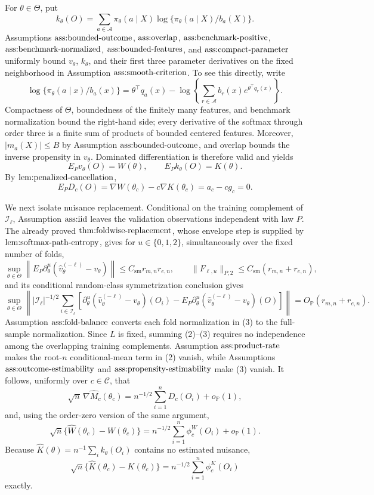 For \(\theta\in\Theta\), put
\[
 k_\theta(O)=\sum_{a\in\mathcal A}\pi_\theta(a\mid X)
 \log\{\pi_\theta(a\mid X)/b_a(X)\}.
\]
Assumptions \(\textnormal{ass:bounded-outcome}\), \(\textnormal{ass:overlap}\), \(\textnormal{ass:benchmark-positive}\), \(\textnormal{ass:benchmark-normalized}\), \(\textnormal{ass:bounded-features}\), and \(\textnormal{ass:compact-parameter}\) uniformly bound \(v_\theta\), \(k_\theta\), and their first three parameter derivatives on the fixed neighborhood in Assumption \(\textnormal{ass:smooth-criterion}\).  To see this directly, write
\[
 \log\{\pi_\theta(a\mid x)/b_a(x)\}
 =\theta^\top q_a(x)-
 \log\!\left\{\sum_{r\in\mathcal A}b_r(x)e^{\theta^\top q_r(x)}\right\}.
\]
Compactness of \(\Theta\), boundedness of the finitely many features, and benchmark normalization bound the right-hand side; every derivative of the softmax through order three is a finite sum of products of bounded centered features.  Moreover, \(|m_a(X)|\le B\) by Assumption \(\textnormal{ass:bounded-outcome}\), and overlap bounds the inverse propensity in \(v_\theta\).  Dominated differentiation is therefore valid and yields
\[
 E_Pv_\theta(O)=W(\theta),\qquad E_Pk_\theta(O)=K(\theta).
\]
By \(\textnormal{lem:penalized-cancellation}\),
\[
 E_PD_c(O)=\nabla W(\theta_c)-c\nabla K(\theta_c)
 =a_c-cg_c=0. \tag{1}
\]

We next isolate nuisance replacement.  Conditional on the training complement of \(\mathcal I_\ell\), Assumption \(\textnormal{ass:iid}\) leaves the validation observations independent with law \(P\).  The already proved \(\textnormal{thm:foldwise-replacement}\), whose envelope step is supplied by \(\textnormal{lem:softmax-path-entropy}\), gives for \(u\in\{0,1,2\}\), simultaneously over the fixed number of folds,
\[
 \sup_{\theta\in\Theta}\left\|E_P\partial_\theta^u
   (\widehat v_\theta^{(-\ell)}-v_\theta)\right\|
 \le C_{\mathrm{sm}}r_{m,n}r_{e,n},
 \qquad
 \|F_{\ell,u}\|_{P,2}\le
 C_{\mathrm{sm}}(r_{m,n}+r_{e,n}), \tag{2}
\]
and its conditional random-class symmetrization conclusion gives
\[
 \sup_{\theta\in\Theta}\left\|
 |\mathcal I_\ell|^{-1/2}\sum_{i\in\mathcal I_\ell}
 \left[\partial_\theta^u(\widehat v_\theta^{(-\ell)}-v_\theta)(O_i)
 -E_P\partial_\theta^u(\widehat v_\theta^{(-\ell)}-v_\theta)(O)\right]
 \right\|=O_{\mathbb P}(r_{m,n}+r_{e,n}). \tag{3}
\]
Assumption \(\textnormal{ass:fold-balance}\) converts each fold normalization in (3) to the full-sample normalization.  Since \(L\) is fixed, summing (2)--(3) requires no independence among the overlapping training complements.  Assumption \(\textnormal{ass:product-rate}\) makes the root-\(n\) conditional-mean term in (2) vanish, while Assumptions \(\textnormal{ass:outcome-estimability}\) and \(\textnormal{ass:propensity-estimability}\) make (3) vanish.  It follows, uniformly over \(c\in\mathcal C\), that
\[
 \sqrt n\,\nabla\widehat M_c(\theta_c)
 =n^{-1/2}\sum_{i=1}^nD_c(O_i)+o_{\mathbb P}(1), \tag{4}
\]
and, using the order-zero version of the same argument,
\[
 \sqrt n\{\widehat W(\theta_c)-W(\theta_c)\}
 =n^{-1/2}\sum_{i=1}^n\phi_c^W(O_i)+o_{\mathbb P}(1). \tag{5}
\]
Because \(\widehat K(\theta)=n^{-1}\sum_i k_\theta(O_i)\) contains no estimated nuisance,
\[
 \sqrt n\{\widehat K(\theta_c)-K(\theta_c)\}
 =n^{-1/2}\sum_{i=1}^n\phi_c^K(O_i) \tag{6}
\]
exactly.

